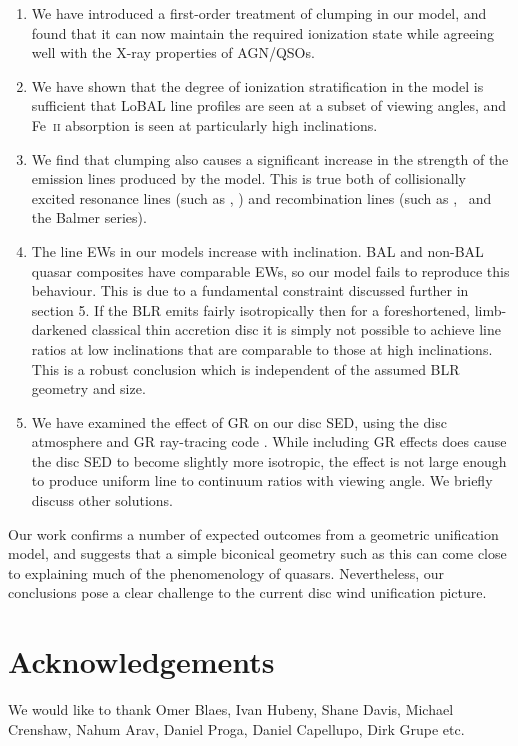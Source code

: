 \documentclass[useAMS,usenatbib]{mn2e_x}
\begin{document}
\begin{enumerate}
\item We have introduced a first-order treatment 
of clumping in our model, and found that it can now maintain
the required ionization state while agreeing well with the X-ray
properties of AGN/QSOs.
\smallskip
\item We have shown that the degree of ionization stratification
in the model is sufficient that LoBAL line profiles
are seen at a subset of viewing angles, and Fe~\textsc{ii}
absorption is seen at particularly high inclinations.
\smallskip
\item We find that clumping also causes a significant 
increase in the strength of the  emission
lines produced by the model. This is true both
of collisionally excited resonance lines (such as \civ, \nv)
and recombination lines (such as \la, \ha\ and the Balmer series).
\smallskip
\item The line EWs in our models increase with inclination.
BAL and non-BAL quasar composites have comparable EWs, so our model
fails to reproduce this behaviour.
This is due to a fundamental constraint discussed further in section 5. If the BLR
emits fairly isotropically then for a foreshortened, limb-darkened classical thin accretion disc
it is simply not possible to achieve line ratios at low inclinations that are comparable to
those at high inclinations. This is a robust conclusion which 
is independent of the assumed BLR geometry and size.
\smallskip
\item We have examined the effect of GR on our disc SED, using the disc atmosphere
and GR ray-tracing code \agn. While including GR effects
does cause the disc SED to become slightly more isotropic,
the effect is not large enough to produce uniform line to continuum ratios
with viewing angle. We briefly discuss other solutions.
\end{enumerate}
Our work confirms a number of expected outcomes from a geometric unification 
model, and suggests that a simple biconical geometry such as this can come close to 
explaining much of the  phenomenology of quasars. Nevertheless, our conclusions pose 
a clear challenge to the current disc wind unification picture.




\section*{Acknowledgements}

We would like to thank Omer Blaes, Ivan Hubeny, Shane Davis, 
Michael Crenshaw, Nahum Arav, Daniel Proga, Daniel Capellupo, Dirk Grupe etc.
\end{document}

